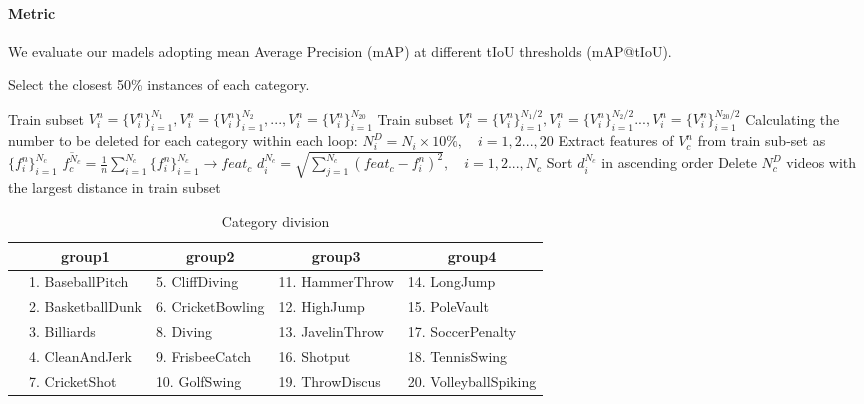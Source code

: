 \documentclass[review]{elsarticle}
\begin{document}
\paragraph{Metric} We evaluate our madels adopting mean Average Precision (mAP) at different tIoU thresholds (mAP@tIoU). 


\begin{algorithm}
    \caption{Select the closest 50\% instances of each category.}
    \begin{algorithmic}[1]
    \Require Train subset $V^n_i = \{V^n_i\}^{N_1}_{i=1}, V^n_i = \{V^n_i\}^{N_2}_{i=1}, ..., V^n_i = \{V^n_i\}^{N_20}_{i=1}$
    \Ensure Train subset $V^n_i = \{V^n_i\}^{N_1 / 2}_{i=1}, V^n_i = \{V^n_i\}^{N_2/2}_{i=1} ..., V^n_i = \{V^n_i\}^{N_{20}/2}_{i=1}$
    \State Calculating the number to be deleted for each category within each loop: $N^D_i = N_i\times 10\% ,   \quad  i = 1, 2..., 20$
            \State Extract features of $V^n_c $ from train sub-set as $\{f^n_i\}^{N_c}_{i=1} $
            \State  $ \overline{f^{N_c}_c} = \frac{1}{n}\sum\limits_{i=1}^{N_c}\{f^n_i\}^{N_c}_{i=1}\rightarrow feat_c $
            \State  $d^{N_c}_i = \sqrt{\sum\limits_{j=1}^{N_c}(feat_c - f^n_i)^2},\quad i = 1,2..., N_c$ 
            \State Sort $d^{N_c}_i$ in ascending order
            \State Delete $N^D_c$ videos with the largest distance in train subset
        \EndFor
    \EndFor
    \end{algorithmic}
\end{algorithm}

\begin{table}[htbp]
  \centering
  \caption{Category division}
    \begin{tabular}{cllll}
    \toprule

          & \multicolumn{1}{c}{group1} & \multicolumn{1}{c}{group2} & \multicolumn{1}{c}{group3} & \multicolumn{1}{c}{group4} \\
    \midrule

          & 1. BaseballPitch & 5. CliffDiving & 11. HammerThrow & 14. LongJump \\
          & 2. BasketballDunk & 6. CricketBowling & 12. HighJump & 15. PoleVault \\
          & 3.  Billiards & 8. Diving & 13. JavelinThrow & 17. SoccerPenalty \\
          & 4. CleanAndJerk & 9. FrisbeeCatch & 16. Shotput & 18. TennisSwing \\
          & 7. CricketShot & 10. GolfSwing & 19. ThrowDiscus & 20. VolleyballSpiking \\

    \bottomrule
    \end{tabular}%
  \label{tab:addlabel}%
\end{table}%
\end{document}
